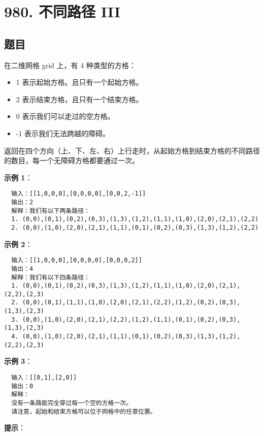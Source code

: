 \newpage
\section{980. 不同路径 III}
\label{leetcode:980}

\subsection{题目}

在二维网格 grid 上，有 4 种类型的方格：

\begin{itemize}
  \item 1 表示起始方格。且只有一个起始方格。
  \item 2 表示结束方格，且只有一个结束方格。
  \item 0 表示我们可以走过的空方格。
  \item -1 表示我们无法跨越的障碍。
\end{itemize}

返回在四个方向（上、下、左、右）上行走时，从起始方格到结束方格的不同路径的数目，每一个无障碍方格都要通过一次。

\textbf{示例 1}：

\begin{verbatim}
  输入：[[1,0,0,0],[0,0,0,0],[0,0,2,-1]]
  输出：2
  解释：我们有以下两条路径：
  1. (0,0),(0,1),(0,2),(0,3),(1,3),(1,2),(1,1),(1,0),(2,0),(2,1),(2,2)
  2. (0,0),(1,0),(2,0),(2,1),(1,1),(0,1),(0,2),(0,3),(1,3),(1,2),(2,2)
\end{verbatim}

\textbf{示例 2}：

\begin{verbatim}
  输入：[[1,0,0,0],[0,0,0,0],[0,0,0,2]]
  输出：4
  解释：我们有以下四条路径：
  1. (0,0),(0,1),(0,2),(0,3),(1,3),(1,2),(1,1),(1,0),(2,0),(2,1),(2,2),(2,3)
  2. (0,0),(0,1),(1,1),(1,0),(2,0),(2,1),(2,2),(1,2),(0,2),(0,3),(1,3),(2,3)
  3. (0,0),(1,0),(2,0),(2,1),(2,2),(1,2),(1,1),(0,1),(0,2),(0,3),(1,3),(2,3)
  4. (0,0),(1,0),(2,0),(2,1),(1,1),(0,1),(0,2),(0,3),(1,3),(1,2),(2,2),(2,3)
\end{verbatim}

\textbf{示例 3}：

\begin{verbatim}
  输入：[[0,1],[2,0]]
  输出：0
  解释：
  没有一条路能完全穿过每一个空的方格一次。
  请注意，起始和结束方格可以位于网格中的任意位置。
\end{verbatim}

\textbf{提示}：

